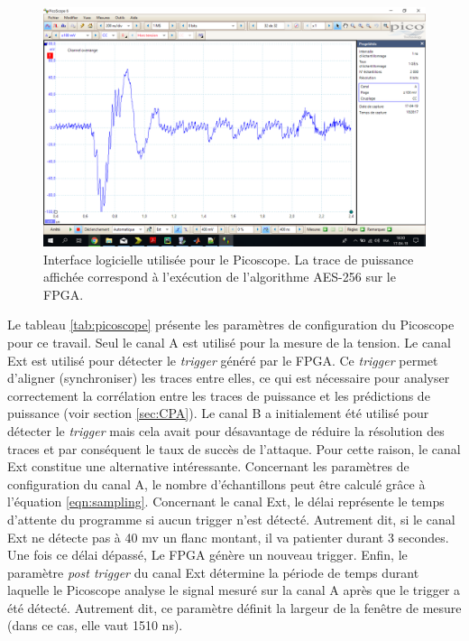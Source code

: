 \documentclass[oneside]{book}
\begin{document}
\begin{figure}[htbp]
    \centering
    \includegraphics[scale=0.45]{image/picoscope_interface}
    \caption{Interface logicielle utilisée pour le Picoscope. La trace de puissance affichée correspond à l'exécution de l'algorithme AES-256 sur le FPGA.}
    \label{fig:picoscope_interface} 
\end{figure}

Le tableau \ref{tab:picoscope} présente les paramètres de configuration du Picoscope pour ce travail. Seul le canal A est utilisé pour la mesure de la tension. Le canal Ext est utilisé pour détecter le \textit{trigger} généré par le FPGA. Ce \textit{trigger} permet d'aligner (synchroniser) les traces entre elles, ce qui est nécessaire pour analyser correctement la corrélation entre les traces de puissance et les prédictions de puissance (voir section \ref{sec:CPA}). Le canal B a initialement été utilisé pour détecter le \textit{trigger} mais cela avait pour désavantage de réduire la résolution des traces et par conséquent le taux de succès de l'attaque. Pour cette raison, le canal Ext constitue une alternative intéressante. Concernant les paramètres de configuration du canal A, le nombre d'échantillons peut être calculé grâce à l'équation \ref{eqn:sampling}. Concernant le canal Ext, le délai représente le temps d'attente du programme si aucun trigger n'est détecté. Autrement dit, si le canal Ext ne détecte pas à 40 mv un flanc montant, il va patienter durant 3 secondes. Une fois ce délai dépassé, Le FPGA génère un nouveau trigger. Enfin, le paramètre \textit{post trigger} du canal Ext détermine la période de temps durant laquelle le Picoscope analyse le signal mesuré sur la canal A après que le trigger a été détecté. Autrement dit, ce paramètre définit la largeur de la fenêtre de mesure (dans ce cas, elle vaut 1510 ns). 
\end{document}
